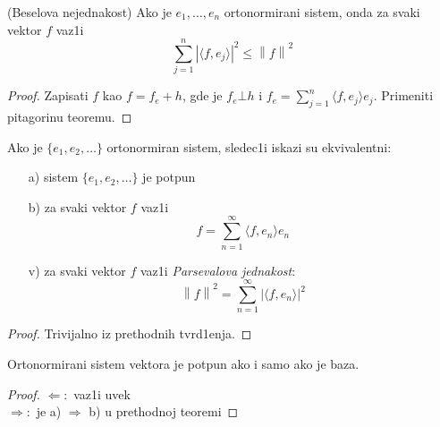 \documentclass[a4paper,12pt]{article}
\newcommand{\norm}[1]{\left\lVert#1\right\rVert}
\begin{document}
\begin{tvr}
(Beselova nejednakost) Ako je $e_1, \dots, e_n$ ortonormirani sistem, onda za svaki vektor $f$ vaz1i
\[\sum_{j=1}^n {| \langle f, e_j \rangle |}^2 \leq \norm{f}^2 \]
\end{tvr}
\begin{proof}
Zapisati $f$ kao $f = f_e + h$, gde je $f_e\bot h$ i $f_e = \sum_{j=1}^n \langle f, e_j \rangle e_j$. Primeniti pitagorinu teoremu.
\end{proof}

\begin{tma}
Ako je $\{e_1, e_2, \dots \}$ ortonormiran sistem, sledec1i iskazi su ekvivalentni:
\begin{itemize}
\item[a)] sistem $\{e_1, e_2, \dots \}$ je potpun
\item[b)] za svaki vektor $f$ vaz1i
\[f = \sum_{n=1}^{\infty} \langle f, e_n \rangle e_n\]
\item[v)] za svaki vektor $f$ vaz1i \textit{Parsevalova jednakost}:
\[\norm{f}^2 = \sum_{n=1}^{\infty} {|\langle f, e_n \rangle |}^2 \]
\end{itemize}
\end{tma}
\begin{proof}
Trivijalno iz prethodnih tvrd1enja.
\end{proof}

\begin{posl}
Ortonormirani sistem vektora je potpun ako i samo ako je baza.
\end{posl}
\begin{proof}
$\boxed{\Leftarrow}:$ vaz1i uvek \\
$\boxed{\Rightarrow}:$ je a) $\Longrightarrow$ b) u prethodnoj teoremi
\end{proof}
\end{document}
